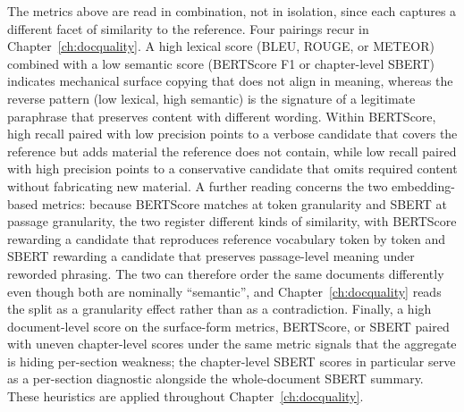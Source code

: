 The metrics above are read in combination, not in isolation, since each captures a different facet of similarity to the reference.
Four pairings recur in Chapter~\ref{ch:docquality}.
A high lexical score (BLEU, ROUGE, or METEOR) combined with a low semantic score (BERTScore F1 or chapter-level SBERT)
indicates mechanical surface copying that does not align in meaning, whereas the reverse pattern (low lexical, high semantic)
is the signature of a legitimate paraphrase that preserves content with different wording.
Within BERTScore, high recall paired with low precision points to a verbose candidate that covers the reference but adds material the reference does not contain,
while low recall paired with high precision points to a conservative candidate that omits required content without fabricating new material.
A further reading concerns the two embedding-based metrics: because BERTScore matches at token granularity and SBERT at passage granularity,
the two register different kinds of similarity, with BERTScore rewarding a candidate that reproduces reference vocabulary token by token and SBERT
rewarding a candidate that preserves passage-level meaning under reworded phrasing.
The two can therefore order the same documents differently even though both are nominally ``semantic'', and Chapter~\ref{ch:docquality} reads the split as a granularity effect rather than as a contradiction.
Finally, a high document-level score on the surface-form metrics, BERTScore, or SBERT paired with uneven chapter-level scores under the same metric signals that the aggregate is hiding per-section weakness;
the chapter-level SBERT scores in particular serve as a per-section diagnostic alongside the whole-document SBERT summary. These heuristics are applied throughout Chapter~\ref{ch:docquality}.

